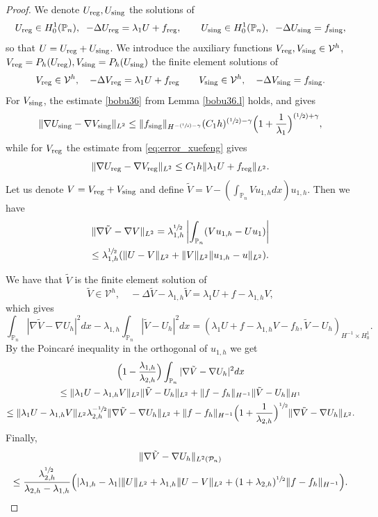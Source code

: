 \documentclass[JEP,XML,SOM,Unicode,ThmDefs,NoFloatCountersInSection,published]{cedram}
\newcommand{\Psfrac}[2]{(\sfrac{#1}{#2})}
\theoremstyle{plain}
\theoremstyle{definition}
\newcommand{\reg}{\textup{reg}}
\newcommand{\sing}{\textup{sing}}
\def\Pp{{\mathbb{P}_n}}
\newcommand{\lb}{\lambda}
\begin{document}
\begin{proof}
We denote $U_{\reg}, U_{\sing}$ the solutions of
\[
U_{\reg} \in H^1_0(\Pp), \;\; -\Delta U_{\reg}= \lb_1 U+ f_{\reg}, \qquad U_{\sing}\in H^1_0(\Pp),\;\; -\Delta U_{\sing} = f_{\sing},
\]
so that $U=U_{\reg}+U_{\sing}$. We introduce the auxiliary functions
$V_{\reg}, V_{\sing} \in \mathcal V^h$, $V_{\reg}=P_h(U_{\reg}), V_{\sing}=P_h(U_{\sing})$ the finite element solutions of
\[
V_{\reg}\in \mathcal V^h, \quad -\Delta V_{\reg} = \lb_1 U +f_{\reg} \qquad V_{\sing} \in \mathcal V^h, \quad -\Delta V_{\sing}= f_{\sing}.
\]
For $V_{\sing}$, the estimate \eqref{bobu36} from Lemma \ref{bobu36.l} holds, and gives
\[
\|\nabla U_{\sing}-\nabla V_{\sing}\|_{L^2} \le \|f_{\sing}\|_{H^{-\Psfrac 12 -\gamma}} (C_1 h)^{\Psfrac 12 -\gamma}\Bigl(1+\frac {1}{\lambda_1}\Bigr)^{\Psfrac 12 +\gamma},
\]
while for $V_{\reg}$ the estimate from \eqref{eq:error_xuefeng} gives
\[
\|\nabla U_{\reg}- \nabla V_{\reg} \|_{L^2} \le C_1 h \| \lb_1 U+ f_{\reg}\|_{L^2}.
\]
Let us denote $V=V_{\reg}+V_{\sing}$ and define $\tilde V= V-(\int_{\Pp} Vu_{1,h} dx) u_{1,h}$. Then we have
\vspace*{-5pt}
\begin{multline}\label{bobu80}
\|\nabla \tilde V-\nabla V\|_{L^2} = \lambda_{1,h}^{\sfrac{1}{2}}
\left|\int_{\Pp} (Vu_{1,h} -Uu_1) \right|\\
\leq \lambda_{1,h}^{\sfrac{1}{2}}(\|U-V\|_{L^2}+\|V\|_{L^2}\|u_{1,h}-u\|_{L^2}).
\end{multline}

We have that $\tilde V$ is the finite element solution of
\[
\tilde V \in \mathcal V^h, \quad -\Delta \tilde V-\lb_{1,h} \tilde V= \lb_1 U +f- \lb_{1,h} V,
\]
which gives
\[
\int_{\Pp} |\nabla \tilde V -\nabla U_h|^2 dx - \lb_{1,h}\int_{\Pp} | \tilde V -U_h|^2 dx= (\lb_1 U +f- \lb_{1,h} V-f_h, \tilde V-U_h)_{H^{-1}\times H^1_0}.
\]
By the Poincaré inequality in the orthogonal of $u_{1,h}$ we get
\vspace*{-5pt}
\begin{multline*}
\Bigl(1- \frac{\lb_{1,h}}{\lb_{2,h}} \Bigr) \int_{\Pp} |\nabla \tilde V -\nabla U_h|^2 dx \\
\le \|\lb_1 U-\lb_{1,h} V\|_{L^2}\| \tilde V-U_h\|_{L^2}+ \|f-f_h\|_{H^{-1}} \| \tilde V - U_h\|_{H^1}\\
\le \|\lb_1 U-\lb_{1,h} V\|_{L^2} \lambda_{2,h}^{-\sfrac{1}{2}} \| \nabla \tilde V-\nabla U_h\|_{L^2}+ \|f-f_h\|_{H^{-1}}\Bigl(1+\frac{1}{\lb_{2,h}}\Bigr)^{\sfrac 12} \| \nabla \tilde V-\nabla U_h\|_{L^2}.
\end{multline*}
Finally,
\vspace*{-5pt}
\begin{multline}\label{bobu81}
\| \nabla \tilde V-\nabla U_h\|_{L^2(\mathcal P_n)}\\
\le \frac{\lb_{2,h}^{\sfrac 12}}{\lb_{2,h}-\lb_{1,h}} \Big (|\lb_{1,h}-\lb_1| \|U\|_{L^2} + \lb_{1,h}\|U-V\|_{L^2}+ (1+ \lb_{2,h})^{\sfrac 12}\|f-f_h\|_{H^{-1}}\Big).\qedhere
\end{multline}
\end{proof}
\end{document}
